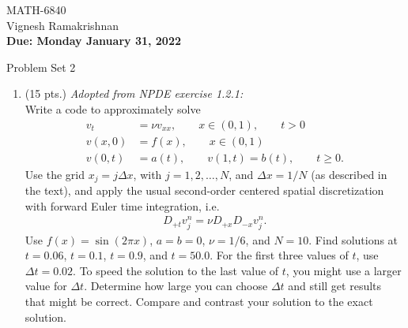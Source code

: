 \documentclass[11pt]{article}
\newcommand{\Dpt}{D_{+t}}
\newcommand{\Dpx}{D_{+x}}
\newcommand{\Dmx}{D_{-x}}
\begin{document}
\begin{flushright}
\small{MATH-6840\\
Vignesh Ramakrishnan\\
{\bf Due: Monday January 31, 2022}}
\end{flushright}

\begin{center}
\large{Problem Set 2}\\
\end{center}


\begin{enumerate}
  \item (15 pts.) {\em Adopted from NPDE exercise 1.2.1:}\\
  {\color{red}Write a code to approximately solve }
  \begin{align*}
    v_t & = \nu v_{xx}, \qquad x\in(0,1), \qquad t>0\\
    v(x,0) & = f(x), \qquad x\in(0,1)\\
    v(0,t) & = a(t), \qquad v(1,t) = b(t), \qquad t\ge 0.
  \end{align*}
  {\color{red} Use the grid} $x_j=j\Delta x$, {\color{red} with} $j=1,2,\ldots,N$, {\color{red}  and} $\Delta x = 1/N$ {\color{red} (as described in the text), and apply the usual second-order centered spatial discretization with forward Euler time integration, i.e.}
  \begin{align*}
    \Dpt v_j^n = \nu\Dpx\Dmx v_j^n.
  \end{align*}
 { \color{red}Use }$f(x) = \sin(2\pi x)$, $a=b=0$, $\nu=1/6$, {\color{red} and} $N=10$. {\color{red} Find solutions at }$t=0.06$, $t=0.1$, $t=0.9$, {\color{red} and} $t=50.0$. {\color{red} For the first three values of} $t$,{\color{red} use} $\Delta t = 0.02$. {\color{red} To speed the solution to the last value of }$t$, {\color{red} you might use a larger value for} $\Delta t$. {\color{red} Determine how large you can choose} $\Delta t$ {\color{red} and still get results that might be correct. Compare and contrast your solution to the exact solution.}


\end{enumerate}
\end{document}

